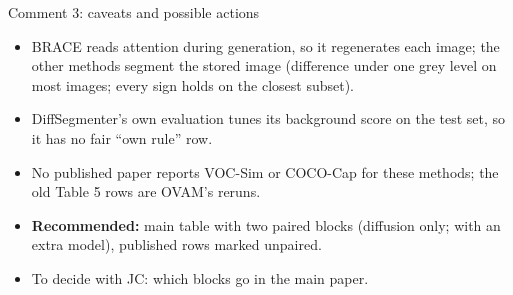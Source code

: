 \begin{frame}{Comment 3: caveats and possible actions}
\begin{itemize}
\item BRACE reads attention during generation, so it regenerates each image; the other methods segment the stored image (difference under one grey level on most images; every sign holds on the closest subset).
\item DiffSegmenter's own evaluation tunes its background score on the test set, so it has no fair ``own rule'' row.
\item No published paper reports VOC-Sim or COCO-Cap for these methods; the old Table 5 rows are OVAM's reruns.
\item \textbf{Recommended:} main table with two paired blocks (diffusion only; with an extra model), published rows marked unpaired.
\item To decide with JC: which blocks go in the main paper.
\end{itemize}
\end{frame}

